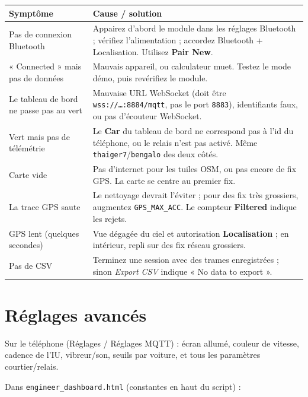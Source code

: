 \documentclass[11pt,a4paper,oneside]{report}
\newcommand{\code}[1]{\texttt{#1}}
\begin{document}
\begin{tabularx}{\linewidth}{@{}LL@{}}
\toprule
\textbf{Symptôme} & \textbf{Cause / solution}\\
\midrule
Pas de connexion Bluetooth & Appairez d'abord le module dans les réglages Bluetooth ; vérifiez l'alimentation ; accordez Bluetooth + Localisation. Utilisez \textbf{Pair New}.\\
« Connected » mais pas de données & Mauvais appareil, ou calculateur muet. Testez le mode démo, puis revérifiez le module.\\
Le tableau de bord ne passe pas au vert & Mauvaise URL WebSocket (doit être \code{wss://\ldots:8884/mqtt}, pas le port \code{8883}), identifiants faux, ou pas d'écouteur WebSocket.\\
Vert mais pas de télémétrie & Le \textbf{Car} du tableau de bord ne correspond pas à l'id du téléphone, ou le relais n'est pas activé. Même \code{thaiger7}/\code{bengalo} des deux côtés.\\
Carte vide & Pas d'internet pour les tuiles OSM, ou pas encore de fix GPS. La carte se centre au premier fix.\\
La trace GPS saute & Le nettoyage devrait l'éviter ; pour des fix très grossiers, augmentez \code{GPS\_MAX\_ACC}. Le compteur \textbf{Filtered} indique les rejets.\\
GPS lent (quelques secondes) & Vue dégagée du ciel et autorisation \textbf{Localisation} ; en intérieur, repli sur des fix réseau grossiers.\\
Pas de CSV & Terminez une session avec des trames enregistrées ; sinon \emph{Export CSV} indique « No data to export ».\\
\bottomrule
\end{tabularx}

\section{Réglages avancés}
Sur le téléphone (Réglages / Réglages MQTT) : écran allumé, couleur de vitesse,
cadence de l'IU, vibreur/son, seuils par voiture, et tous les paramètres
courtier/relais.

\medskip
\noindent Dans \code{engineer\_dashboard.html} (constantes en haut du script) :
\end{document}

